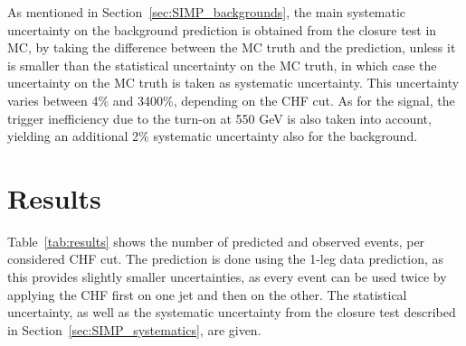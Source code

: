 As mentioned in Section~\ref{sec:SIMP_backgrounds}, the main systematic uncertainty on the background prediction is obtained from the closure test in MC, by taking the difference between the MC truth and the prediction, unless it is smaller than the statistical uncertainty on the MC truth, in which case the uncertainty on the MC truth is taken as systematic uncertainty. This uncertainty varies between 4\% and 3400\%, depending on the CHF cut. As for the signal, the trigger inefficiency due to the turn-on at 550 GeV is also taken into account, yielding an additional 2\% systematic uncertainty also for the background.

\section{Results}
\label{sec:SIMP_results}

Table~\ref{tab:results} shows the number of predicted and observed events, per considered CHF cut. The prediction is done using the 1-leg data prediction, as this provides slightly smaller uncertainties, as every event can be used twice by applying the CHF first on one jet and then on the other. The statistical uncertainty, as well as the systematic uncertainty from the closure test described in Section~\ref{sec:SIMP_systematics}, are given.

